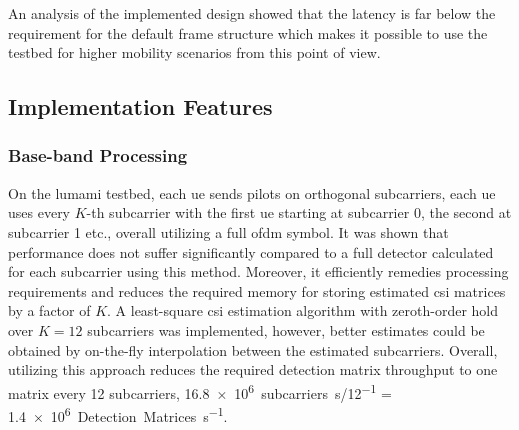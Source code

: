 \documentclass[journal]{IEEEtran}
\begin{document}
An analysis of the implemented design showed that the latency is far below the requirement for the default frame structure which makes it possible to use the testbed for higher mobility scenarios from this point of view\cite{sips_steffen}.

\subsection{Implementation Features}
\subsubsection{Base-band Processing}
%
On the \gls{lumami} testbed, each \gls{ue} sends pilots on orthogonal subcarriers, \ie each \gls{ue} uses every $K$-th subcarrier with the first \gls{ue} starting at subcarrier 0, the second at subcarrier 1 etc., overall utilizing a full \gls{ofdm} symbol.
It was shown that performance does not suffer significantly compared to a full detector calculated for each subcarrier using this method\cite{deliverable3_2}.
Moreover, it efficiently remedies processing requirements and reduces the required memory for storing estimated \gls{csi} matrices by a factor of $K$.
A least-square \gls{csi} estimation algorithm with zeroth-order hold over $K=12$ subcarriers was implemented, however, better estimates could be obtained by on-the-fly interpolation between the estimated subcarriers.
Overall, utilizing this approach reduces the required detection matrix throughput to one matrix every 12 subcarriers, \ie \SI{16.8e6}{subcarriers\per\second/12} = \SI{1.4e6}{Detection Matrices\per\second}.  
\end{document}
